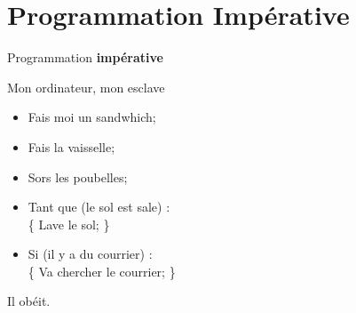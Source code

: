 \section{Programmation Impérative}

\begingroup
{}
\begin{frame}
    \begin{center}
        \vspace{1cm}
        {\Large\color{background} Programmation \textbf{impérative}}
    \end{center}
\end{frame}
\endgroup

\begin{frame}[c]{Mon ordinateur, mon esclave}
  \begin{center}
    \begin{itemize}
      \item<+-> Fais moi un sandwhich;
      \item<+-> Fais la vaisselle;
      \item<+-> Sors les poubelles;
      \item<+-> Tant que (le sol est sale) :\\
        \{ Lave le sol; \}
      \item<+-> Si (il y a du courrier) :\\
        \{ Va chercher le courrier; \}
    \end{itemize}
    \onslide<+->
    \vspace{1cm}
    Il obéit.
  \end{center}
\end{frame}
